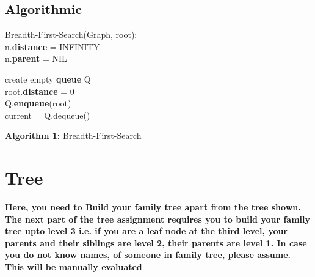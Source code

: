 \documentclass{article}
\begin{document}
\subsection{Algorithmic}
\begin{algorithm}[H]

\SetAlgoLined
Breadth-First-Search(Graph, root):\\
  {n.\textbf{distance} = INFINITY\\n.\textbf{parent} = NIL}

create empty \textbf{queue} Q\\
root.\textbf{distance} = 0\\
Q.\textbf{enqueue}(root)\\
{current = Q.dequeue()\\
}
\end{algorithm}
{\centering
\textbf{Algorithm 1:} Breadth-First-Search\\
}

\section{Tree}

\bigskip

\textbf{Here, you need to Build your family tree apart from the tree shown. The next part of the tree assignment requires you to build your family tree upto level 3 i.e. if you are a leaf node at the third level, your parents and their siblings are level 2, their parents are level 1. In case you do not know names, of someone in family tree, please assume. This will be manually evaluated}
\end{document}
